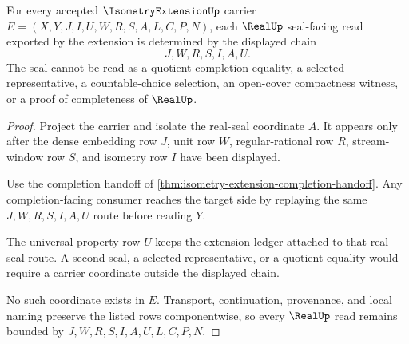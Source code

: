 \begin{theorem}
\label{thm:isometry-extension-real-seal-boundary}
For every accepted $\IsometryExtensionUp$ carrier $E=(X,Y,J,I,U,W,R,S,A,L,C,P,N)$, each $\RealUp$ seal-facing read exported by the extension is determined by the displayed chain
$$
J,W,R,S,I,A,U .
$$
The seal cannot be read as a quotient-completion equality, a selected representative, a countable-choice selection, an open-cover compactness witness, or a proof of completeness of $\RealUp$.
\end{theorem}
\begin{proof}
Project the carrier and isolate the real-seal coordinate $A$. It appears only after the dense embedding row $J$, unit row $W$, regular-rational row $R$, stream-window row $S$, and isometry row $I$ have been displayed.

Use the completion handoff of \autoref{thm:isometry-extension-completion-handoff}. Any completion-facing consumer reaches the target side by replaying the same $J,W,R,S,I,A,U$ route before reading $Y$.

The universal-property row $U$ keeps the extension ledger attached to that real-seal route. A second seal, a selected representative, or a quotient equality would require a carrier coordinate outside the displayed chain.

No such coordinate exists in $E$. Transport, continuation, provenance, and local naming preserve the listed rows componentwise, so every $\RealUp$ read remains bounded by $J,W,R,S,I,A,U,L,C,P,N$.
\end{proof}

\begin{closurestatus}{\IsometryExtensionUp}
  \theoryclosure{\seedClosure}
  \formalstatus{\unformalizedV}
\end{closurestatus}
